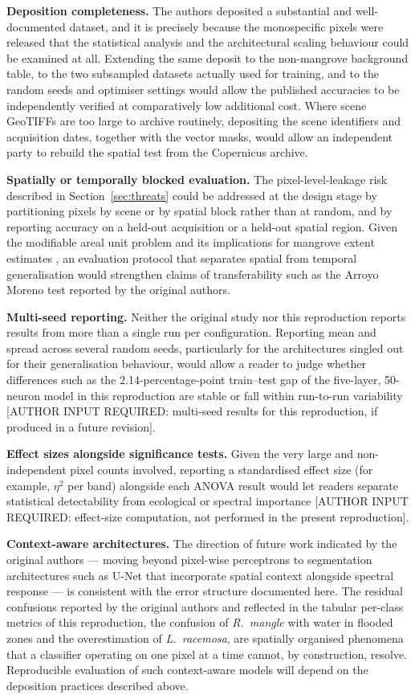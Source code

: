 \documentclass[10pt,twocolumn,a4paper]{article}
\begin{document}
\textbf{Deposition completeness.} The authors deposited a substantial and well-documented dataset,
and it is precisely because the monospecific pixels were released that the statistical analysis and
the architectural scaling behaviour could be examined at all. Extending the same deposit to the
non-mangrove background table, to the two subsampled datasets actually used for training, and to the
random seeds and optimiser settings would allow the published accuracies to be independently
verified at comparatively low additional cost. Where scene GeoTIFFs are too large to archive
routinely, depositing the scene identifiers and acquisition dates, together with the vector masks,
would allow an independent party to rebuild the spatial test from the Copernicus archive.

\textbf{Spatially or temporally blocked evaluation.} The pixel-level-leakage risk described in
Section~\ref{sec:threats} could be addressed at the design stage by partitioning pixels by scene or
by spatial block rather than at random, and by reporting accuracy on a held-out acquisition or a
held-out spatial region. Given the modifiable areal unit problem and its implications for mangrove
extent estimates \citep{jelinski1996}, an evaluation protocol that separates spatial from temporal
generalisation would strengthen claims of transferability such as the Arroyo Moreno test reported by
the original authors.

\textbf{Multi-seed reporting.} Neither the original study nor this reproduction reports results
from more than a single run per configuration. Reporting mean and spread across several random
seeds, particularly for the architectures singled out for their generalisation behaviour, would
allow a reader to judge whether differences such as the 2.14-percentage-point train--test gap of the
five-layer, 50-neuron model in this reproduction are stable or fall within run-to-run variability
[AUTHOR INPUT REQUIRED: multi-seed results for this reproduction, if produced in a future revision].

\textbf{Effect sizes alongside significance tests.} Given the very large and non-independent pixel
counts involved, reporting a standardised effect size (for example, $\eta^2$ per band) alongside
each ANOVA result would let readers separate statistical detectability from ecological or spectral
importance [AUTHOR INPUT REQUIRED: effect-size computation, not performed in the present
reproduction].

\textbf{Context-aware architectures.} The direction of future work indicated by the original
authors --- moving beyond pixel-wise perceptrons to segmentation architectures such as U-Net that
incorporate spatial context alongside spectral response --- is consistent with the error structure
documented here. The residual confusions reported by the original authors and reflected in the
tabular per-class metrics of this reproduction, the confusion of \emph{R.\ mangle} with water in
flooded zones and the overestimation of \emph{L.\ racemosa}, are spatially organised phenomena that
a classifier operating on one pixel at a time cannot, by construction, resolve. Reproducible
evaluation of such context-aware models will depend on the deposition practices described above.
\end{document}
